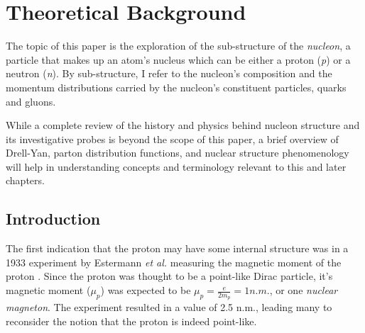 \chapter{Theoretical Background}


The topic of this paper is the exploration of the sub-structure of the \emph{nucleon}, a particle that makes up an atom's nucleus which can be either a proton (\emph{p}) or a neutron (\emph{n}). By sub-structure, I refer to the nucleon's composition and the momentum distributions carried by the nucleon's constituent particles, quarks and gluons.

While a complete review of the history and physics behind nucleon structure and its investigative probes is beyond the scope of this paper, a brief overview of Drell-Yan, parton distribution functions, and nuclear structure phenomenology will help in understanding concepts and terminology relevant to this and later chapters.

\section{Introduction}

The first indication that the proton may have some internal structure was in a 1933 experiment by Estermann \emph{et al.} measuring the magnetic moment of the proton \cite{Estermann:169E}. Since the proton was thought to be a point-like Dirac particle, it's magnetic moment ($\mu_p$) was expected to be $\mu_p = \frac{e}{2 m_p} = 1 n.m.$, or one \emph{nuclear magneton}. The experiment resulted in a value of 2.5 n.m., leading many to reconsider the notion that the proton is indeed point-like.

